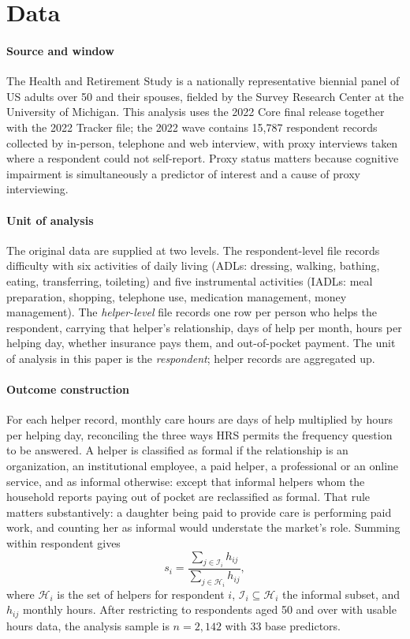 \documentclass[9pt,twoside]{pnas-new}
\begin{document}
\section*{Data}

\paragraph{Source and window} The Health and Retirement Study \cite{hrs2022} is
a nationally representative biennial panel of US adults over 50 and their
spouses, fielded by the Survey Research Center at the University of Michigan.
This analysis uses the 2022 Core final release together with the 2022 Tracker
file; the 2022 wave
contains 15,787 respondent records collected by in-person, telephone and web
interview, with proxy interviews taken where a respondent could not self-report.
Proxy status matters because cognitive impairment is simultaneously a
predictor of interest and a cause of proxy interviewing.

\paragraph{Unit of analysis} The original data are supplied at two levels. The
respondent-level file records difficulty with six activities of daily living
(ADLs: dressing, walking, bathing, eating, transferring, toileting) and five
instrumental activities (IADLs: meal preparation, shopping, telephone use,
medication management, money management). The \emph{helper-level} file records
one row per person who helps the respondent, carrying that helper's relationship,
days of help per month, hours per helping day, whether insurance pays them, and
out-of-pocket payment. The unit of analysis in this paper is the
\emph{respondent}; helper records are aggregated up.

\paragraph{Outcome construction} For each helper record, monthly care hours are
days of help multiplied by hours per helping day, reconciling the three ways HRS
permits the frequency question to be answered. A helper is classified as
formal if the relationship is an organization, an institutional employee,
a paid helper, a professional or an online service, and as informal
otherwise: except that informal helpers whom the household reports paying out of
pocket are reclassified as formal. That rule matters substantively: a daughter
being paid to provide care is performing paid work, and counting her as informal
would understate the market's role. Summing within respondent gives
\begin{equation}
\label{eq:outcome}
s_i = \frac{\sum_{j \in \mathcal{I}_i} h_{ij}}{\sum_{j \in \mathcal{H}_i} h_{ij}},
\end{equation}
where $\mathcal{H}_i$ is the set of helpers for respondent $i$, $\mathcal{I}_i
\subseteq \mathcal{H}_i$ the informal subset, and $h_{ij}$ monthly hours. After
restricting to respondents aged 50 and over with usable hours data, the analysis
sample is $n = 2{,}142$ with 33 base predictors.
\end{document}
